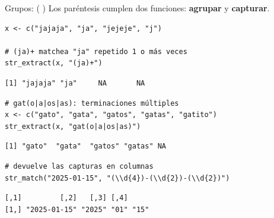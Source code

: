 \documentclass[8pt]{beamer}
\begin{document}
\begin{frame}[fragile]{Grupos: ( )}
	Los paréntesis cumplen dos funciones: \textbf{agrupar} y \textbf{capturar}.
	
\begin{lstlisting}[style=RScript]
x <- c("jajaja", "ja", "jejeje", "j")

# (ja)+ matchea "ja" repetido 1 o más veces
str_extract(x, "(ja)+")
\end{lstlisting}
\begin{lstlisting}[style=RConsole]
[1] "jajaja" "ja"     NA       NA
\end{lstlisting}
\begin{lstlisting}[style=RScript]
# gat(o|a|os|as): terminaciones múltiples
x <- c("gato", "gata", "gatos", "gatas", "gatito")
str_extract(x, "gat(o|a|os|as)")
\end{lstlisting}
\begin{lstlisting}[style=RConsole]
[1] "gato"  "gata"  "gatos" "gatas" NA
\end{lstlisting}

\begin{lstlisting}[style=RScript]
# devuelve las capturas en columnas
str_match("2025-01-15", "(\\d{4})-(\\d{2})-(\\d{2})")
\end{lstlisting}
\begin{lstlisting}[style=RConsole]
     [,1]         [,2]   [,3] [,4]
[1,] "2025-01-15" "2025" "01" "15"
\end{lstlisting}
\end{frame}
\end{document}
